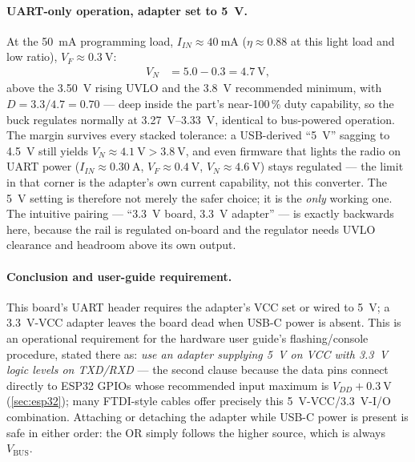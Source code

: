 \paragraph{UART-only operation, adapter set to 5~V.} At the
\SI{50}{\milli\ampere} programming load, $I_{IN} \approx \SI{40}{\milli\ampere}$
($\eta\approx0.88$ at this light load and low ratio), $V_F \approx \SI{0.3}{\volt}$:
\begin{align*}
  V_N &= 5.0 - 0.3 = \SI{4.7}{\volt},
\end{align*}
above the \SI{3.50}{\volt} rising UVLO and the \SI{3.8}{\volt} recommended minimum,
with $D = 3.3/4.7 = 0.70$ --- deep inside the part's near-100\,\% duty capability, so
the buck regulates normally at \SIrange{3.27}{3.33}{\volt}, identical to bus-powered
operation. The margin survives every stacked tolerance: a USB-derived
``\SI{5}{\volt}'' sagging to \SI{4.5}{\volt} still yields $V_N \approx
\SI{4.1}{\volt} > \SI{3.8}{\volt}$, and even firmware that lights the radio on UART
power ($I_{IN} \approx \SI{0.30}{\ampere}$, $V_F \approx \SI{0.4}{\volt}$, $V_N
\approx \SI{4.6}{\volt}$) stays regulated --- the limit in that corner is the
adapter's own current capability, not this converter. The \SI{5}{\volt} setting is
therefore not merely the safer choice; it is the \emph{only} working one. The
intuitive pairing --- ``3.3~V board, 3.3~V adapter'' --- is exactly backwards here,
because the rail is regulated on-board and the regulator needs UVLO clearance and
headroom above its own output.

\paragraph{Conclusion and user-guide requirement.} This board's UART header requires
the adapter's VCC set or wired to \SI{5}{\volt}; a \SI{3.3}{\volt}-VCC adapter leaves
the board dead when USB-C power is absent. This is an operational requirement for the
hardware user guide's flashing/console procedure, stated there as: \emph{use an
adapter supplying \SI{5}{\volt} on VCC with \SI{3.3}{\volt} logic levels on TXD/RXD}
--- the second clause because the data pins connect directly to ESP32 GPIOs whose
recommended input maximum is $V_{DD}+\SI{0.3}{\volt}$ (\cref{sec:esp32}); many
FTDI-style cables offer precisely this 5~V-VCC/3.3~V-I/O combination. Attaching or
detaching the adapter while USB-C power is present is safe in either order: the OR
simply follows the higher source, which is always $V_{\mathrm{BUS}}$.

